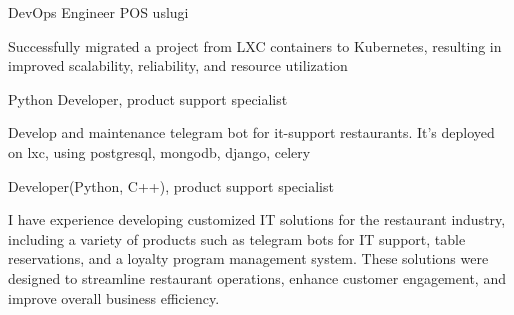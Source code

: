 

\begin{cventries}

  \cventry
    {DevOps Engineer} %
    {POS uslugi} %
    {} %
    {} %
    {
      \begin{cvitems} %
      Successfully migrated a project from LXC containers to Kubernetes, resulting in improved scalability, reliability, and resource utilization
      \end{cvitems}
    }



  \cventry
    {Python Developer, product support specialist} %
    {} %
    {} %
    {} %
    {
      \begin{cvitems} %
        Develop and maintenance telegram bot for it-support restaurants. It's deployed on lxc,
        using postgresql, mongodb, django, celery
      \end{cvitems}
    }

  \cventry
    {Developer(Python, C++), product support specialist} %
    {} %
    {} %
    {} %
    {
      \begin{cvitems} %
        I have experience developing customized IT solutions for the restaurant industry,
        including a variety of products such as telegram bots for IT support, table reservations, and a loyalty program management system.
        These solutions were designed to streamline restaurant operations, enhance customer engagement, and improve overall business efficiency.
      \end{cvitems}
    }


\end{cventries}
